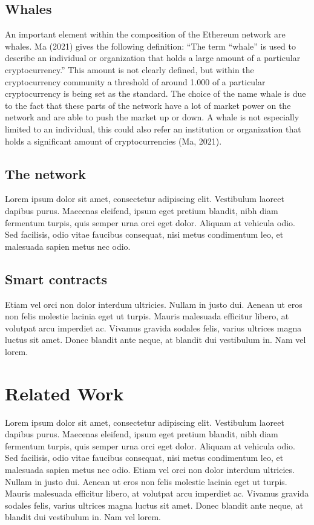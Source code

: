 \documentclass[10pt,a4paper]{article}
\begin{document}
\begin{multicols}{2}
\subsection{Whales}
An important element within the composition of the Ethereum network are whales. Ma (2021) gives the following definition: “The term “whale” is used to describe an individual or organization that holds a large amount of a particular cryptocurrency.” This amount is not clearly defined, but within the cryptocurrency community a threshold of around 1.000 of a particular cryptocurrency is being set as the standard. The choice of the name whale is due to the fact that these parts of the network have a lot of market power on the network and are able to push the market up or down. A whale is not especially limited to an individual, this could also refer an institution or organization that holds a significant amount of cryptocurrencies (Ma, 2021).
\subsection{The network}
Lorem ipsum dolor sit amet, consectetur adipiscing elit. Vestibulum laoreet dapibus purus. Maecenas eleifend, ipsum eget pretium blandit, nibh diam fermentum turpis, quis semper urna orci eget dolor. Aliquam at vehicula odio. Sed facilisis, odio vitae faucibus consequat, nisi metus condimentum leo, et malesuada sapien metus nec odio. 
\subsection{Smart contracts}
Etiam vel orci non dolor interdum ultricies. Nullam in justo dui. Aenean ut eros non felis molestie lacinia eget ut turpis. Mauris malesuada efficitur libero, at volutpat arcu imperdiet ac. Vivamus gravida sodales felis, varius ultrices magna luctus sit amet. Donec blandit ante neque, at blandit dui vestibulum in. Nam vel lorem.
\section{Related Work}
	Lorem ipsum dolor sit amet, consectetur adipiscing elit. Vestibulum laoreet dapibus purus. Maecenas eleifend, ipsum eget pretium blandit, nibh diam fermentum turpis, quis semper urna orci eget dolor. Aliquam at vehicula odio. Sed facilisis, odio vitae faucibus consequat, nisi metus condimentum leo, et malesuada sapien metus nec odio. Etiam vel orci non dolor interdum ultricies. Nullam in justo dui. Aenean ut eros non felis molestie lacinia eget ut turpis. Mauris malesuada efficitur libero, at volutpat arcu imperdiet ac. Vivamus gravida sodales felis, varius ultrices magna luctus sit amet. Donec blandit ante neque, at blandit dui vestibulum in. Nam vel lorem.

\end{multicols}
\end{document}
